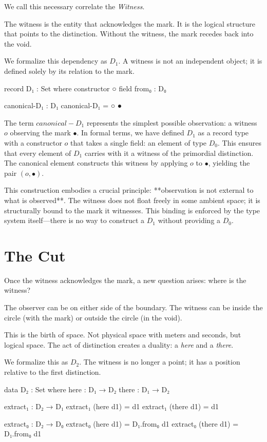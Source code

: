 \documentclass[11pt,a4paper]{book}
\def\circ{o}%
\def\text#1{#1}%
\begin{document}
We call this necessary correlate the \emph{Witness}.

The witness is the entity that acknowledges the mark. It is the logical 
structure that points to the distinction. Without the witness, the mark 
recedes back into the void.

We formalize this dependency as $D_1$. A witness is not an independent 
object; it is defined solely by its relation to the mark.

\begin{code}
record D₁ : Set where
  constructor ○
  field
    from₀ : D₀

canonical-D₁ : D₁
canonical-D₁ = ○ ●
\end{code}

The term $\text{canonical-}D_1$ represents the simplest possible observation: 
a witness $\circ$ observing the mark $\bullet$. In formal terms, we have defined 
$D_1$ as a record type with a constructor $\circ$ that takes a single field: an 
element of type $D_0$. This ensures that every element of $D_1$ carries with it 
a witness of the primordial distinction. The canonical element constructs this 
witness by applying $\circ$ to $\bullet$, yielding the pair $(\circ, \bullet)$.

This construction embodies a crucial principle: **observation is not external to 
what is observed**. The witness does not float freely in some ambient space; it 
is structurally bound to the mark it witnesses. This binding is enforced by the 
type system itself—there is no way to construct a $D_1$ without providing a $D_0$.

\chapter{The Cut}

Once the witness acknowledges the mark, a new question arises: where is the 
witness?

The observer can be on either side of the boundary. 
The witness can be inside the circle (with the mark) or outside the circle 
(in the void).

This is the birth of space. Not physical space with meters and seconds, but 
logical space. The act of distinction creates a duality: a \emph{here} and 
a \emph{there}.

We formalize this as $D_2$. The witness is no longer a point; it has a 
position relative to the first distinction.

\begin{code}
data D₂ : Set where
  here  : D₁ → D₂
  there : D₁ → D₂

extract₁ : D₂ → D₁
extract₁ (here d1)  = d1
extract₁ (there d1) = d1

extract₀ : D₂ → D₀
extract₀ (here d1)  = D₁.from₀ d1
extract₀ (there d1) = D₁.from₀ d1
\end{code}
\end{document}
